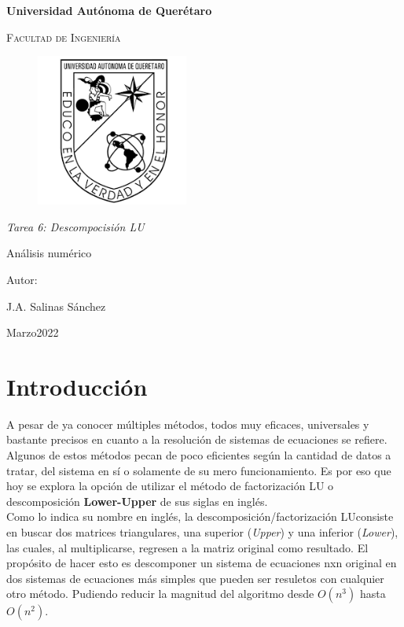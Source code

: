 \documentclass[12pt,oneside,FLEQN]{report}
\begin{document}
{
\selectfont
\begin{titlepage}
        \topmargin=0cm
        \centering

        {\bfseries\LARGE Universidad Autónoma de Querétaro \par}
        \vspace{1cm}
        {\scshape\Large  Facultad de Ingenier\'ia  \par}
        \vspace{2cm}
        \centering
        \begin{figure}[!h]
        \centering
                \includegraphics[height=5cm]{Logouaq.png}
        \end{figure}
        \vspace{3cm}
        {\itshape\large Tarea 6: Descompocisión LU\par}
        \vspace{3cm}
        {\Huge Análisis numérico \par}
        \vspace{2cm}
        {\Large Autor: \par}
        {\large J.A. Salinas Sánchez \par}
        {\large Marzo2022 \par}
\end{titlepage}
\tableofcontents
\chapter{Introducción}
A pesar de ya conocer múltiples métodos, todos muy eficaces, universales y bastante precisos en cuanto a la resolución de sistemas de ecuaciones se refiere. Algunos de estos métodos pecan de poco eficientes según la cantidad de datos a tratar, del sistema en sí o solamente de su mero funcionamiento. Es por eso que hoy se explora la opción de utilizar el método de factorización LU o descomposición {\bf Lower-Upper} de sus siglas en inglés.\\

Como lo indica su nombre en inglés, la descomposición/factorización LUconsiste en buscar dos matrices triangulares, una superior ({\it Upper}) y una inferior ({\it Lower}), las cuales, al multiplicarse, regresen a la matriz original como resultado. El propósito de hacer esto es descomponer un sistema de ecuaciones nxn original en dos sistemas de ecuaciones más simples que pueden ser resuletos con cualquier otro método. Pudiendo reducir la magnitud del algoritmo desde $O(n^{3})$ hasta $O(n^{2})$.\\

}
\end{document}
